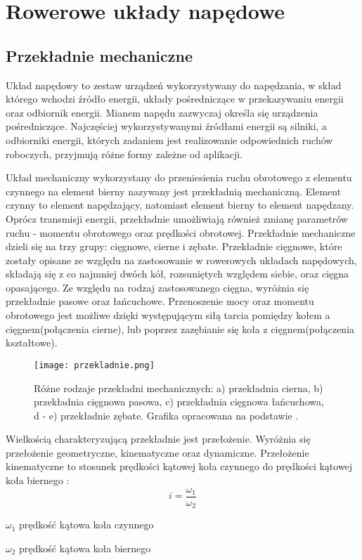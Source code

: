 \chapter{Rowerowe układy napędowe}

\section{Przekładnie mechaniczne}
Układ napędowy to zestaw urządzeń wykorzystywany do napędzania, w skład którego wchodzi źródło energii, układy pośredniczące w przekazywaniu energii oraz odbiornik energii. Mianem napędu zazwyczaj określa się urządzenia pośredniczące. Najczęściej wykorzystywanymi źródłami energii są silniki, a odbiorniki energii, których zadaniem jest realizowanie odpowiednich ruchów roboczych, przyjmują różne formy zależne od aplikacji.

Układ mechaniczny wykorzystany do przeniesienia ruchu obrotowego z elementu czynnego na element bierny nazywany jest przekładnią mechaniczną. Element czynny to element napędzający, natomiast element bierny to element napędzany. Oprócz transmisji energii, przekładnie umożliwiają również zmianę parametrów ruchu - momentu obrotowego oraz prędkości obrotowej. Przekładnie mechaniczne dzieli się na trzy grupy: cięgnowe, cierne i zębate. Przekładnie cięgnowe, które zostały opisane ze względu na zastosowanie w rowerowych układach napędowych, składają się z co najmniej dwóch kół, rozsuniętych względem siebie, oraz cięgna opasającego. Ze względu na rodzaj zastosowanego cięgna, wyróżnia się przekładnie pasowe oraz łańcuchowe. Przenoszenie mocy oraz momentu obrotowego jest możliwe dzięki występującym siłą tarcia pomiędzy kołem a cięgnem(połączenia cierne), lub poprzez zazębianie się koła z cięgnem(połączenia kształtowe).
\begin{figure}[h]
    \centering
    \texttt{[image: przekladnie.png]}
    \caption{Różne rodzaje przekładni mechanicznych: a) przekładnia cierna, b) przekładnia cięgnowa pasowa, c) przekładnia cięgnowa łańcuchowa, d - e) przekładnie zębate. Grafika opracowana na podstawie \cite{maszyny1}.}
    \label{fig:przekladnia}
\end{figure}

Wielkością charakteryzującą przekładnie jest przełożenie. Wyróżnia się przełożenie geometryczne, kinematyczne oraz dynamiczne. Przełożenie kinematyczne to stosunek prędkości kątowej koła czynnego do prędkości kątowej koła biernego \cite{przekladnie}:
\begin{equation}
    i = \frac{\omega_1}{\omega_2}
    \label{eq:przelozenieKinematyczne}
\end{equation}
\begin{eqwhere}[2cm]
	\item[$\omega_1$] prędkość kątowa koła czynnego
	\item[$\omega_2$] prędkość kątowa koła biernego
\end{eqwhere}

